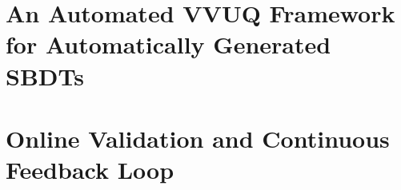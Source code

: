 \section{An Automated VVUQ Framework for Automatically Generated SBDTs}
\label{sec:framework}

\section{Online Validation and Continuous Feedback Loop}
\label{sec:online-validation}
